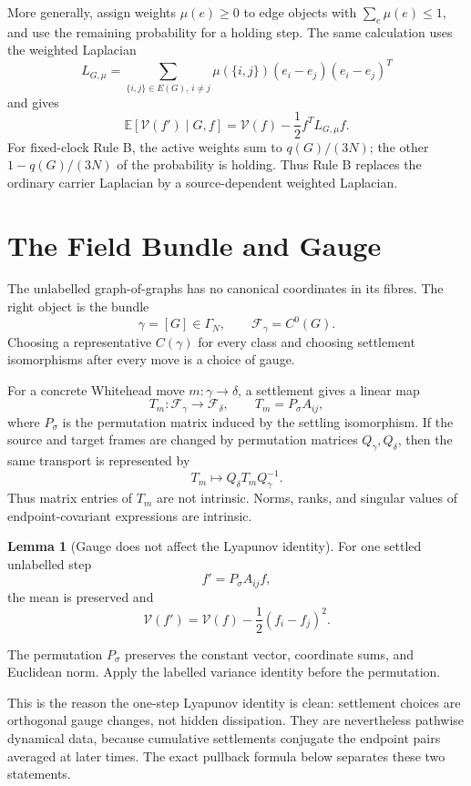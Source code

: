 \documentclass[11pt]{article}
\makeatletter
\newcommand{\E}{\mathbb E}
\newcommand{\G}{\Gamma}
\newcommand{\F}{\mathcal F}
\newcommand{\V}{\mathcal V}
\theoremstyle{definition}
\newtheorem{lemma}[theorem]{Lemma}
\renewenvironment{proof}[1][\proofname]{\par
  \pushQED{\qed}%
  \normalfont \topsep6\p@\@plus6\p@\relax
  \trivlist
  \item[\hskip\labelsep\bfseries #1\@addpunct{.}]\ignorespaces
}{%
  \popQED\endtrivlist\@endpefalse
}
\makeatother
\begin{document}
More generally, assign weights $\mu(e)\ge0$ to edge objects with
$\sum_e\mu(e)\le1$, and use the remaining probability for a holding step.  The
same calculation uses the weighted Laplacian
\[
    L_{G,\mu}
    =
    \sum_{\{i,j\}\in E(G),\,i\neq j}
    \mu(\{i,j\})(e_i-e_j)(e_i-e_j)^T
\]
and gives
\[
    \E[\V(f')\mid G,f]
    =
    \V(f)-\frac12 f^TL_{G,\mu}f.
\]
For fixed-clock Rule B, the active weights sum to $q(G)/(3N)$; the other
$1-q(G)/(3N)$ of the probability is holding.  Thus Rule B replaces the
ordinary carrier Laplacian by a source-dependent weighted Laplacian.

\section{The Field Bundle and Gauge}

The unlabelled graph-of-graphs has no canonical coordinates in its fibres.  The
right object is the bundle
\[
    \gamma=[G]\in\G_N,
    \qquad
    \F_\gamma=C^0(G).
\]
Choosing a representative $C(\gamma)$ for every class and choosing settlement
isomorphisms after every move is a choice of gauge.

For a concrete Whitehead move $m:\gamma\to\delta$, a settlement gives a linear
map
\[
    T_m:\F_\gamma\to\F_\delta,
    \qquad
    T_m=P_\sigma A_{ij},
\]
where $P_\sigma$ is the permutation matrix induced by the settling isomorphism.
If the source and target frames are changed by permutation matrices
$Q_\gamma,Q_\delta$, then the same transport is represented by
\[
    T_m\mapsto Q_\delta T_m Q_\gamma^{-1}.
\]
Thus matrix entries of $T_m$ are not intrinsic.  Norms, ranks, and singular
values of endpoint-covariant expressions are intrinsic.

\begin{lemma}[Gauge does not affect the Lyapunov identity]
For one settled unlabelled step
\[
    f'=P_\sigma A_{ij}f,
\]
the mean is preserved and
\[
    \V(f')=\V(f)-\frac12(f_i-f_j)^2.
\]
\end{lemma}

\begin{proof}
The permutation $P_\sigma$ preserves the constant vector, coordinate sums, and
Euclidean norm.  Apply the labelled variance identity before the permutation.
\end{proof}

This is the reason the one-step Lyapunov identity is clean: settlement choices
are orthogonal gauge changes, not hidden dissipation.  They are nevertheless
pathwise dynamical data, because cumulative settlements conjugate the endpoint
pairs averaged at later times.  The exact pullback formula below separates
these two statements.
\end{document}
